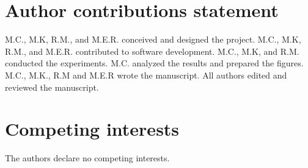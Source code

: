 \documentclass[fleqn,10pt]{wlscirep}
\begin{document}
\section*{Author contributions statement}

M.C., M.K, R.M., and M.E.R. conceived and designed the project.
M.C., M.K, R.M., and M.E.R. contributed to software development. 
M.C., M.K, and R.M. conducted the experiments.
M.C. analyzed the results and prepared the figures.
M.C., M.K., R.M and M.E.R wrote the manuscript. 
All authors edited and reviewed the manuscript.

\section*{Competing interests}

The authors declare no competing interests.



\end{document}
